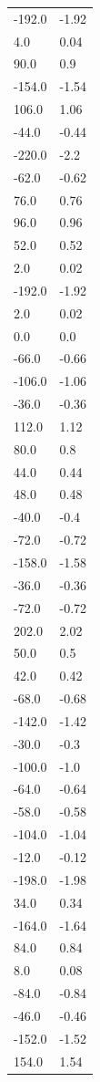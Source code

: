 \begin{longtable}{ll}
-192.0 & -1.92 \\
4.0 & 0.04 \\
90.0 & 0.9 \\
-154.0 & -1.54 \\
106.0 & 1.06 \\
-44.0 & -0.44 \\
-220.0 & -2.2 \\
-62.0 & -0.62 \\
76.0 & 0.76 \\
96.0 & 0.96 \\
52.0 & 0.52 \\
2.0 & 0.02 \\
-192.0 & -1.92 \\
2.0 & 0.02 \\
0.0 & 0.0 \\
-66.0 & -0.66 \\
-106.0 & -1.06 \\
-36.0 & -0.36 \\
112.0 & 1.12 \\
80.0 & 0.8 \\
44.0 & 0.44 \\
48.0 & 0.48 \\
-40.0 & -0.4 \\
-72.0 & -0.72 \\
-158.0 & -1.58 \\
-36.0 & -0.36 \\
-72.0 & -0.72 \\
202.0 & 2.02 \\
50.0 & 0.5 \\
42.0 & 0.42 \\
-68.0 & -0.68 \\
-142.0 & -1.42 \\
-30.0 & -0.3 \\
-100.0 & -1.0 \\
-64.0 & -0.64 \\
-58.0 & -0.58 \\
-104.0 & -1.04 \\
-12.0 & -0.12 \\
-198.0 & -1.98 \\
34.0 & 0.34 \\
-164.0 & -1.64 \\
84.0 & 0.84 \\
8.0 & 0.08 \\
-84.0 & -0.84 \\
-46.0 & -0.46 \\
-152.0 & -1.52 \\
154.0 & 1.54 \\

\end{longtable}
